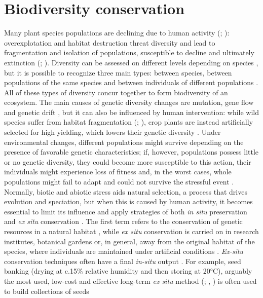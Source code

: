 \documentclass[a4paper, 12pt]{report}
\begin{document}
\section{Biodiversity conservation}
Many plant species populations are declining due to human activity  (\cite{suppleConservationBiodiversityGenomics2018}; \cite{yinPlantConservationAge2024}): overexplotation and habitat destruction threat diversity \parencite{penceDefiningExceptionalSpecies2022} and lead to fragmentation and isolation of populations, susceptible to decline and ultimately extinction (\cite{aguilarGeneticConsequencesHabitat2008}; \cite{iucn/sscGuidelinesUseEx2014}). Diversity can be assessed on different levels depending on species \parencite{habelBurdenGeneticDiversity2012}, but it is possible to recognize three main types: between species, between populations of the same species and between individuals of different populations \parencite{salgotraGeneticDiversityConservation2023}. All of these types of diversity concur together to form biodiversity of an ecosystem. The main causes of genetic diversity changes are mutation, gene flow and genetic drift \parencite{salgotraGeneticDiversityConservation2023}, but it can also be influenced by human intervention: while wild species suffer from habitat fragmentation (\cite{aguilarGeneticConsequencesHabitat2008}; \cite{habelBurdenGeneticDiversity2012}), crop plants are instead artificially selected for high yielding, which lowers their genetic diversity \parencite{salgotraGeneticDiversityConservation2023}. Under environmental changes, different populations might survive depending on the presence of favorable genetic characteristics; if, however, populations possess little or no genetic diversity, they could become more susceptible to this action, their individuals might experience loss of fitness \parencite{habelBurdenGeneticDiversity2012} and, in the worst cases, whole populations might fail to adapt \parencite{suppleConservationBiodiversityGenomics2018} and could not survive the stressful event \parencite{salgotraGeneticDiversityConservation2023}. Normally, biotic and abiotic stress aids natural selection, a process that drives evolution and speciation, but when this is caused by human activity, it becomes essential to limit its influence and apply strategies of both \textit{in situ} preservation and \textit{ex situ} conservation \parencite{iucn/sscGuidelinesUseEx2014}. The first term refers to the conservation of genetic resources in a natural habitat \parencite{vijayanGermplasmConservationMulberry2011}, while \textit{ex situ} conservation is carried on in research institutes, botanical gardens or, in general, away from the original habitat of the species, where individuals are maintained under artificial conditions \parencite{iucn/sscGuidelinesUseEx2014}. \textit{Ex-situ} conservation techniques often have a final \textit{in-situ} output \parencite{volisQuasiSituBridge2010}. For example, seed banking (drying at c.15\% relative humidity and then storing at 20°C), arguably the most used, low-cost and effective long-term \textit{ex situ} method  (\cite{volisQuasiSituBridge2010}; \cite{penceDefiningExceptionalSpecies2022}, \cite{salgotraGeneticDiversityConservation2023}) is often used to build collections of seeds 
\end{document}
